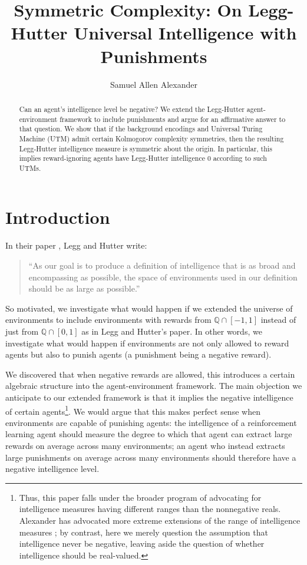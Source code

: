 \documentclass{article}
\title{Symmetric Complexity: On Legg-Hutter Universal Intelligence with Punishments}
\author{Samuel Allen Alexander}
\begin{document}
\maketitle

\begin{abstract}
    Can an agent's intelligence level be negative?
    We extend the Legg-Hutter agent-environment framework to include punishments
    and argue for an affirmative answer to that question.
    We show that if the background encodings and Universal Turing Machine (UTM) admit
    certain Kolmogorov complexity symmetries,
    then the resulting Legg-Hutter intelligence measure is symmetric about
    the origin. In particular, this implies reward-ignoring agents
    have Legg-Hutter intelligence $0$ according to such UTMs.
\end{abstract}

\section{Introduction}

In their paper \cite{legg2007universal}, Legg and Hutter write:
\begin{quote}
    ``As our goal is to produce a definition of intelligence that is as broad and
    encompassing as possible, the space of environments used in our definition should
    be as large as possible.''
\end{quote}
So motivated, we investigate what would happen if we extended the universe
of environments to include environments with rewards from $\mathbb Q\cap [-1,1]$
instead of just from $\mathbb Q\cap [0,1]$ as in Legg and Hutter's paper.
In other words, we investigate what would happen if environments are not only
allowed to reward agents but also to punish agents (a punishment being a negative
reward).

We discovered that when negative rewards are allowed, this
introduces a certain algebraic structure into the agent-environment framework. The
main objection we anticipate to our extended framework
is that it implies the negative intelligence of certain
agents\footnote{Thus, this paper falls under the broader
program of advocating for intelligence measures having different ranges than
the nonnegative reals. Alexander has advocated
more extreme extensions of the range of intelligence measures
\cite{alexander2020archimedean} \cite{alexander2021measuring}; by contrast,
here we merely question the
assumption that intelligence never be negative, leaving aside the
question of whether intelligence should be real-valued.}.
We would argue that this makes perfect sense when environments are capable of punishing
agents: the intelligence of a reinforcement learning agent should measure the
degree to which that agent can extract large rewards on average across many environments;
an agent who instead extracts large punishments on average across many environments
should therefore have a negative intelligence level.
\end{document}
